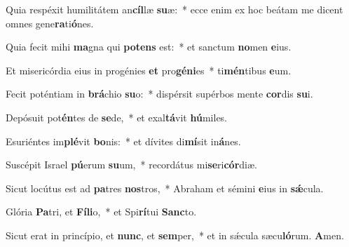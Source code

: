 \item Quia respéxit humilitátem an\textbf{cíl}læ \textbf{su}æ:~* ecce enim ex hoc beátam me dicent omnes gene\textbf{ra}ti\textbf{ó}nes.

\item Quia fecit mihi \textbf{ma}gna qui \textbf{pot}\textbf{ens} est:~* et sanctum \textbf{no}men \textbf{e}ius.

\item Et misericórdia eius in progénies \textbf{et} pro\textbf{gé}\textbf{ni}es~* ti\textbf{mén}tibus \textbf{e}um.

\item Fecit poténtiam in \textbf{brá}chio \textbf{su}o:~* dispérsit supérbos mente \textbf{cor}dis \textbf{su}i.

\item Depósuit pot\textbf{én}tes de \textbf{se}de,~* et exal\textbf{tá}vit \textbf{hú}miles.

\item Esuriéntes im\textbf{plé}vit \textbf{bo}nis:~* et dívites di\textbf{mí}sit in\textbf{á}nes.

\item Suscépit Israel \textbf{pú}erum \textbf{su}um,~* recordátus mi\textbf{se}ri\textbf{cór}diæ.

\item Sicut locútus est ad \textbf{pa}tres \textbf{nos}tros,~* Abraham et sémini \textbf{e}ius in \textbf{sǽ}cula.

\item Glória \textbf{Pa}tri, et \textbf{Fí}\textbf{li}o,~* et Spi\textbf{rí}tui \textbf{Sanc}to.

\item Sicut erat in princípio, et \textbf{nunc}, et \textbf{sem}per,~* et in sǽcula sæcu\textbf{ló}rum. \textbf{A}men.